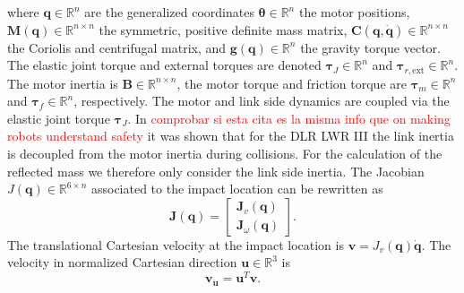 where $\mathbf{q} \in \mathbb{R}^n$ are the generalized coordinates $\mathbf{\theta} \in \mathbb{R}^n$ the motor positions, $\mathbf{M}(\mathbf{q})  \in \mathbb{R}^{n \times n}$ the symmetric, positive definite mass matrix, $\mathbf{C}(\mathbf{q}, \dot{\mathbf{q}})  \in \mathbb{R}^{n \times n}$ the Coriolis and centrifugal matrix, and $\mathbf{g}(\mathbf{q}) \in \mathbb{R}^n$ the gravity torque vector. The elastic joint torque and external torques are denoted $\mathbf{\tau}_J  \in \mathbb{R}^n$ and $\mathbf{\tau}_{r,\mathrm{ext}} \in \mathbb{R}^n$. The motor inertia is $\mathbf{B} \in \mathbb{R}^{n \times n}$, the motor torque and friction torque are $\mathbf{\tau}_m \in \mathbb{R}^n$ and $\mathbf{\tau}_f \in \mathbb{R}^n$, respectively. The motor and link side dynamics are coupled via the elastic joint torque $\mathbf{\tau}_J$.
In \cite{haddadin_et_al_ijrr2009} \textcolor{red}{comprobar si esta cita es la misma info que on making robots understand safety} it was shown that for the DLR LWR III the link inertia is decoupled from the motor inertia during collisions. For the calculation of the reflected mass we therefore only consider the link side inertia. The Jacobian $J(\mathbf{q}) \in \mathbb{R}^{6 \times n}$ associated to the impact location can be rewritten as
\begin{equation}
\mathbf{J}(\mathbf{q}) = 
\begin{bmatrix}
\mathbf{J}_{v}(\mathbf{q}) \\
\mathbf{J}_{\omega}(\mathbf{q})
\end{bmatrix}.
\label{eq:jacobian_expanded}
\end{equation}
The translational Cartesian velocity at the impact location is 
$\mathbf{v} = J_{v}({\mathbf{q}}) \dot{\mathbf{q}}$. The velocity in normalized Cartesian direction $\mathbf{u} \in \mathbb{R}^3$ is 
\begin{equation}
\mathbf{v_u} = \mathbf{u}^T \mathbf{v} .
\end{equation}

